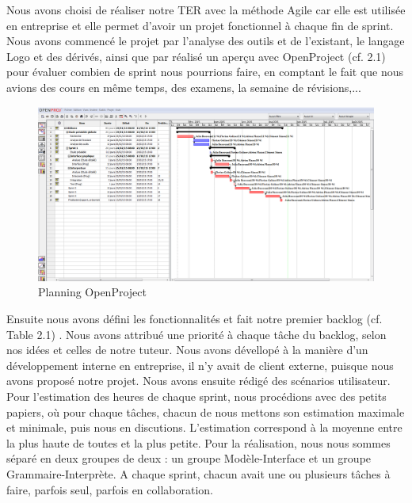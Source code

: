 Nous avons choisi de réaliser notre TER avec la méthode Agile car elle est utilisée en entreprise et elle permet d'avoir un projet fonctionnel à chaque fin de sprint.
Nous avons commencé le projet par l'analyse des outils et de l'existant, le langage Logo et des dérivés, ainsi que par réalisé un aperçu avec OpenProject (cf. 2.1) pour évaluer combien de sprint nous pourrions faire, en comptant le fait que nous avions des cours en même temps, des examens, la semaine de révisions,...\\
\begin{figure}[h]
\caption{\label{planning} Planning OpenProject}
\includegraphics[scale=0.35]{doc/gestionProjet/planning.PNG}
\end{figure}
Ensuite nous avons défini les fonctionnalités et fait notre premier backlog (cf. Table 2.1) .
Nous avons attribué une priorité à chaque tâche du backlog, selon nos idées et celles de notre tuteur. Nous avons dévellopé à la manière d'un développement interne en entreprise, il n'y avait de client externe, puisque nous avons proposé notre projet.
Nous avons ensuite rédigé des scénarios utilisateur.
Pour l'estimation des heures de chaque sprint, nous procédions avec des petits papiers, où pour chaque tâches, chacun de nous mettons son estimation maximale et minimale, puis nous en discutions. L'estimation correspond à la moyenne entre la plus haute de toutes et la plus petite.
Pour la réalisation, nous nous sommes séparé en deux groupes de deux : un groupe Modèle-Interface et un groupe Grammaire-Interprète.
A chaque sprint, chacun avait une ou plusieurs tâches à faire, parfois seul, parfois en collaboration.

